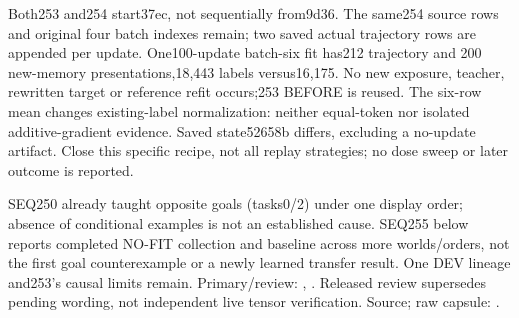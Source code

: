 \documentclass[11pt]{article}
\begin{document}
Both253 and254 start37ec, not sequentially from9d36. The same254 source rows
and original four batch indexes remain; two saved actual trajectory rows
are appended per update. One100-update batch-six fit has212 trajectory and
200 new-memory presentations,18,443 labels versus16,175. No new exposure,
teacher, rewritten target or reference refit occurs;253 BEFORE is reused.
The six-row mean changes existing-label normalization: neither equal-token
nor isolated additive-gradient evidence. Saved state52658b differs, excluding
a no-update artifact. Close this specific recipe, not all replay strategies;
no dose sweep or later outcome is reported.

SEQ250 already taught opposite goals (tasks0/2) under one display order;
absence of conditional examples is not an established cause. SEQ255 below
reports completed NO-FIT collection and baseline across more worlds/orders,
not the first goal counterexample or a newly learned transfer result.
One DEV lineage and253's causal limits remain. Primary/review:
,
.
Released review supersedes pending wording, not independent live tensor
verification. Source; raw capsule:
.
\end{document}
